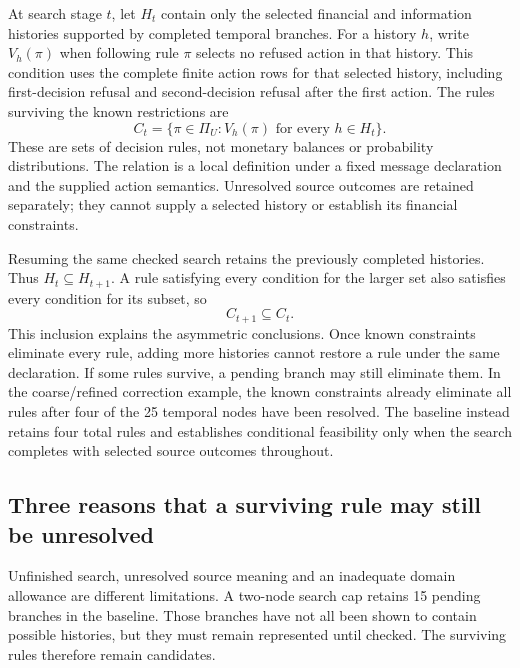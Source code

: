 At search stage $t$, let $H_t$ contain only the selected financial and information histories supported by completed temporal branches. For a history $h$, write $V_h(\pi)$ when following rule $\pi$ selects no refused action in that history. This condition uses the complete finite action rows for that selected history, including first-decision refusal and second-decision refusal after the first action. The rules surviving the known restrictions are
\begin{equation}
 C_t=\{\pi\in\Pi_U:V_h(\pi)\text{ for every }h\in H_t\}.
 \label{eq:prospective-policy-restriction}
\end{equation}
These are sets of decision rules, not monetary balances or probability distributions. The relation is a local definition under a fixed message declaration and the supplied action semantics. Unresolved source outcomes are retained separately; they cannot supply a selected history or establish its financial constraints.

Resuming the same checked search retains the previously completed histories. Thus $H_t\subseteq H_{t+1}$. A rule satisfying every condition for the larger set also satisfies every condition for its subset, so
\begin{equation}
 C_{t+1}\subseteq C_t.
 \label{eq:prospective-policy-monotone}
\end{equation}
This inclusion explains the asymmetric conclusions. Once known constraints eliminate every rule, adding more histories cannot restore a rule under the same declaration. If some rules survive, a pending branch may still eliminate them. In the coarse/refined correction example, the known constraints already eliminate all rules after four of the 25 temporal nodes have been resolved. The baseline instead retains four total rules and establishes conditional feasibility only when the search completes with selected source outcomes throughout.

\subsection{Three reasons that a surviving rule may still be unresolved}

Unfinished search, unresolved source meaning and an inadequate domain allowance are different limitations. A two-node search cap retains 15 pending branches in the baseline. Those branches have not all been shown to contain possible histories, but they must remain represented until checked. The surviving rules therefore remain candidates.

